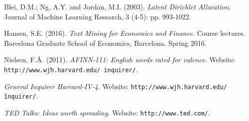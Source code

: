 \documentclass[a4paper, 11pt]{article} %
\begin{document}
\begin{thebibliography}{9}

Blei, D.M.; Ng, A.Y. and Jordan, M.I. (2003).
\textit{Latent Dirichlet Allocation}.
Journal of Machine Learning Research, 3 (4-5): pp. 993-1022.

Hansen, S.E. (2016).
\textit{Text Mining for Economics and Finance}. Course lectures.
Barcelona Graduate School of Economics, Barcelona. Spring 2016. 

Nielsen, F.\AA. (2011).
\textit{AFINN-111: English words rated for valence}.
Website: \texttt{http://www.wjh.harvard.edu/~inquirer/}.

\textit{General Inquirer Harvard-IV-4}.
Website: \texttt{http://www.wjh.harvard.edu/\~inquirer/}.

\textit{TED Talks: Ideas worth spreading}.
Website: \texttt{http://www.ted.com/}.


\end{thebibliography}
\end{document}
